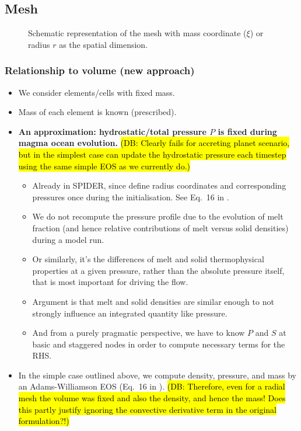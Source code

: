 \documentclass[12pt,notitlepage]{article}
\newcommand{\dbnote}[1]{\sethlcolor{bluehl}\hl{(DB: #1)}}
\begin{document}
\subsection{Mesh}
\begin{figure}[!h]
\begin{center}

\end{center}
\caption{Schematic representation of the mesh with mass coordinate ($\xi$) or radius $r$ as the spatial dimension.}
\end{figure}
\subsubsection{Relationship to volume (new approach)}
\begin{itemize}
\item We consider elements/cells with fixed mass.
\item Mass of each element is known (prescribed).
\item \textbf{An approximation: hydrostatic/total pressure $P$ is fixed during magma ocean evolution.}  \dbnote{Clearly fails for accreting planet scenario, but in the simplest case can update the hydrostatic pressure each timestep using the same simple EOS as we currently do.}
\begin{itemize}
\item Already in SPIDER, since define radius coordinates and corresponding pressures once during the initialisation.  See Eq.~16 in \cite{BSW18}.
\item We do not recompute the pressure profile due to the evolution of melt fraction (and hence relative contributions of melt versus solid densities) during a model run.
\item Or similarly, it's the differences of melt and solid thermophysical properties at a given pressure, rather than the absolute pressure itself, that is most important for driving the flow.
\item Argument is that melt and solid densities are similar enough to not strongly influence an integrated quantity like pressure.
\item And from a purely pragmatic perspective, we have to know $P$ and $S$ at basic and staggered nodes in order to compute necessary terms for the RHS.
\end{itemize}
\item In the simple case outlined above, we compute density, pressure, and mass by an Adams-Williamson EOS (Eq.~16 in \cite{BSW18}).  \dbnote{Therefore, even for a radial mesh the volume was fixed and also the density, and hence the mass!  Does this partly justify ignoring the convective derivative term in the original formulation?!}

\end{itemize}
\end{document}
